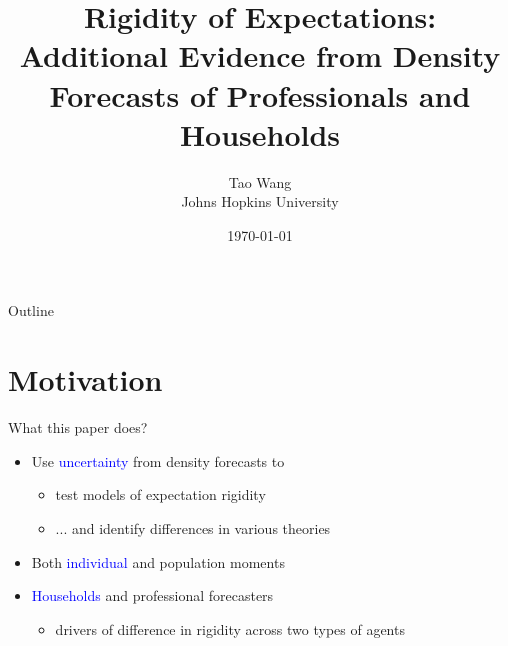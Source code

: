 \documentclass{beamer}
\title{Rigidity of Expectations: Additional Evidence from Density Forecasts of Professionals and Households}
\author{Tao Wang \\ Johns Hopkins University}
\date{\today}
\begin{document}
	
	
\begin{frame}
	\titlepage
\end{frame}
\begin{frame}{Outline}
	\tableofcontents
\end{frame}

\section{Motivation}



\begin{frame}{What this paper does?}
\begin{itemize}
	\item Use \textcolor{blue}{uncertainty} from density forecasts to 
	\begin{itemize}
		\item test models of expectation rigidity 
		\item ... and identify differences in various theories 
	\end{itemize}
	\item Both \textcolor{blue}{individual} and population moments 
	\item \textcolor{blue}{Households} and professional forecasters 
	\begin{itemize}
		\item drivers of difference in rigidity across two types of agents
	\end{itemize}
\end{itemize}
\end{frame}
\end{document}
